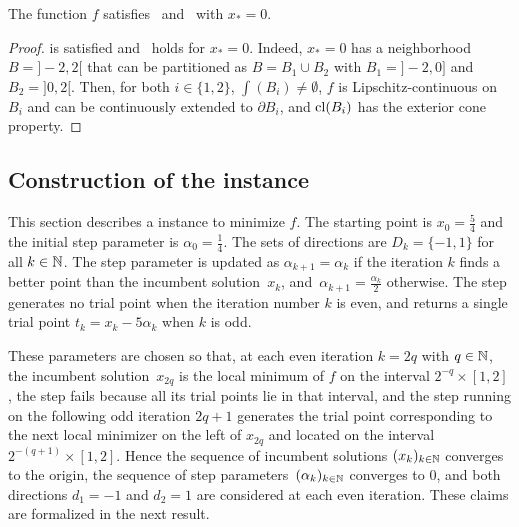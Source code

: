 \vspace{0.1cm}

\begin{proposition}
	\label{prop:behavior_f}
	The function $f$ satisfies~\cite[Assumption~2.1]{ViCu2012} and~\cite[Assumption~4.1]{ViCu2012} with $x_* = 0$.
\end{proposition}

\begin{proof}
	\cite[Assumption~2.1]{ViCu2012} is satisfied and~\cite[Assumption~4.1]{ViCu2012} holds for $x_* = 0$.
	Indeed, $x_* = 0$ has a neighborhood $B = {]}-2,2[$ that can be partitioned as $B = B_1 \cup B_2$ with $B_1 = {]}-2,0]$ and $B_2 = {]}0,2[$.
	Then, for both $i \in \{1,2\}$, $\int(B_i) \neq \emptyset$, $f$ is Lipschitz-continuous on $B_i$ and can be continuously extended to $\partial B_i$, and $\mathrm{cl}(B_i)$ has the exterior cone property.
\end{proof}



\subsection{Construction of the \ddsm instance}
\label{sec:counterexample/mads}

This section describes a \ddsm instance to minimize $f$.
The starting point is $x_0 = \frac{5}{4}$ and the initial step parameter is $\alpha_0 = \frac{1}{4}$.
The \poll sets of directions are $D_k = \{-1,1\}$ for all $k \in \mathbb{N}$.
The step parameter is updated as $\alpha_{k+1} = \alpha_k$ if the iteration $k$ finds a better point than the incumbent solution~$x_k$, and~$\alpha_{k+1} = \frac{\alpha_k}{2}$ otherwise.
The \search step generates no trial point when the iteration number $k$ is even, and returns a single trial point $t_k = x_k - 5\alpha_k$ when $k$ is odd.

These parameters are chosen so that, at each even iteration $k=2q$ with $q \in \mathbb{N}$, the incumbent solution~$x_{2q}$ is the local minimum of $f$ on the interval $2^{-q} \times [1,2]$, the \poll step fails because all its trial points lie in that interval, and the \search step running on the following odd iteration $2q+1$ generates the trial point corresponding to the next local minimizer on the left of $x_{2q}$ and located on the interval~$2^{-(q+1)}\times[1,2]$.
Hence the sequence of incumbent solutions $(x_k)_{k\in\mathbb{N}}$ converges to the origin, the sequence of step parameters~$(\alpha_k)_{k\in\mathbb{N}}$ converges to $0$, and both directions $d_1 = -1$ and $d_2 = 1$ are considered at each even iteration.
These claims are formalized in the next result.

